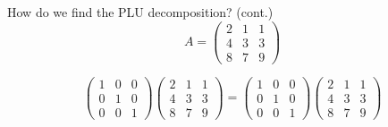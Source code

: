 \documentclass{beamer}
\begin{document}
\begin{frame}{How do we find the PLU decomposition? (cont.)}
\[A=
\begin{pmatrix}{}
                2 & 1 & 1 \\
                4 & 3 & 3 \\
                8 & 7 & 9
            \end{pmatrix}
            \]
            \pause
            
            \[
  \begin{pmatrix}{}
                1 & 0 & 0 \\
                0 & 1 & 0 \\
                0 & 0 & 1
            \end{pmatrix}\begin{pmatrix}{}
                2 & 1 & 1 \\
                4 & 3 & 3 \\
                8 & 7 & 9
            \end{pmatrix}
            =\begin{pmatrix}{}
                1 & 0 & 0 \\
                0 & 1 & 0 \\
                0 & 0 & 1
            \end{pmatrix}
            \begin{pmatrix}{}
                2 & 1 & 1 \\
                4 & 3 & 3 \\
                8 & 7 & 9
            \end{pmatrix}
            \]
            

\end{frame}
\end{document}
